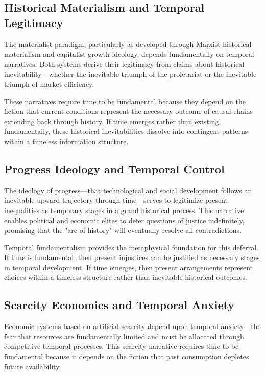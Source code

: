 \documentclass[12pt]{article}
\begin{document}
\subsection{Historical Materialism and Temporal Legitimacy}

The materialist paradigm, particularly as developed through Marxist historical materialism and capitalist growth ideology, depends fundamentally on temporal narratives. Both systems derive their legitimacy from claims about historical inevitability—whether the inevitable triumph of the proletariat or the inevitable triumph of market efficiency.

These narratives require time to be fundamental because they depend on the fiction that current conditions represent the necessary outcome of causal chains extending back through history. If time emerges rather than existing fundamentally, these historical inevitabilities dissolve into contingent patterns within a timeless information structure.

\subsection{Progress Ideology and Temporal Control}

The ideology of progress—that technological and social development follows an inevitable upward trajectory through time—serves to legitimize present inequalities as temporary stages in a grand historical process. This narrative enables political and economic elites to defer questions of justice indefinitely, promising that the "arc of history" will eventually resolve all contradictions.

Temporal fundamentalism provides the metaphysical foundation for this deferral. If time is fundamental, then present injustices can be justified as necessary stages in temporal development. If time emerges, then present arrangements represent choices within a timeless structure rather than inevitable historical outcomes.

\subsection{Scarcity Economics and Temporal Anxiety}

Economic systems based on artificial scarcity depend upon temporal anxiety—the fear that resources are fundamentally limited and must be allocated through competitive temporal processes. This scarcity narrative requires time to be fundamental because it depends on the fiction that past consumption depletes future availability.
\end{document}

